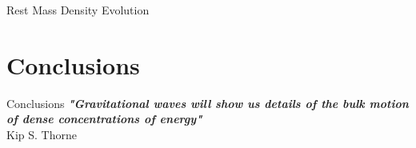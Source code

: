 \documentclass{beamer}
\theoremstyle{definition}
\theoremstyle{plain}
\begin{document}
\begin{frame}{Rest Mass Density Evolution}
\begin{figure}
    \centering
    \end{figure}
\end{frame}

\section{Conclusions}
\begin{frame}{Conclusions}
\emph{\textbf{"Gravitational
waves will show us details of the bulk motion of
dense concentrations of energy"}}\\
\vspace{0.2cm} Kip S. Thorne
\begin{figure}
    \centering
    \end{figure}
\end{frame}
\end{document}

